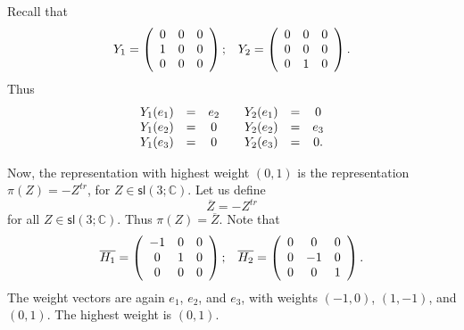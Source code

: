 \documentclass[12pt]{amsbook}
\theoremstyle{plain}
\numberwithin{equation}{chapter}
\numberwithin{theorem}{chapter}
\begin{document}
Recall that
\[%
\begin{array}
[c]{cc}%
Y_{1}=\left(
\begin{array}
[c]{ccc}%
0 & 0 & 0\\
1 & 0 & 0\\
0 & 0 & 0
\end{array}
\right)  ; & Y_{2}=\left(
\begin{array}
[c]{ccc}%
0 & 0 & 0\\
0 & 0 & 0\\
0 & 1 & 0
\end{array}
\right)  \text{.}%
\end{array}
\]
Thus
\begin{equation}%
\begin{array}
[c]{ccccccc}%
Y_{1}(e_{1}) & = & e_{2} &  & Y_{2}(e_{1}) & = & 0\\
Y_{1}(e_{2}) & = & 0 &  & Y_{2}(e_{2}) & = & e_{3}\\
Y_{1}(e_{3}) & = & 0 &  & Y_{2}(e_{3}) & = & 0\text{.}%
\end{array}
\label{weight1.0}%
\end{equation}

Now, the representation with highest weight $\left(  0,1\right)  $ is the
representation $\pi(Z)=-Z^{tr}$, for $Z\in\mathsf{sl}\left(  3;\mathbb{C}%
\right)  $. Let us define
\[
\overline{Z}=-Z^{tr}%
\]
for all $Z\in\mathsf{sl}\left(  3;\mathbb{C}\right)  $. Thus $\pi
(Z)=\overline{Z}$. Note that
\[%
\begin{array}
[c]{cc}%
\overline{H_{1}}=\left(
\begin{array}
[c]{ccc}%
-1 & 0 & 0\\
0 & 1 & 0\\
0 & 0 & 0
\end{array}
\right)  ; & \overline{H_{2}}=\left(
\begin{array}
[c]{ccc}%
0 & 0 & 0\\
0 & -1 & 0\\
0 & 0 & 1
\end{array}
\right)  \text{.}%
\end{array}
\]
The weight vectors are again $e_{1}$, $e_{2}$, and $e_{3}$, with weights
$\left(  -1,0\right)  $, $\left(  1,-1\right)  $, and $\left(  0,1\right)  $.
The highest weight is $\left(  0,1\right)  $.
\end{document}
